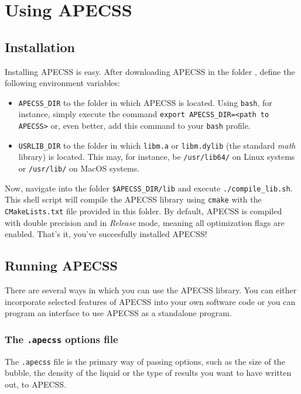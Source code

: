 \chapter{Using APECSS}

\section{Installation}
\label{sec:installation}

Installing APECSS is easy. After downloading APECSS in the folder {\tt <path to APECSS>}, define the following environment variables:\vspace{-1em}
\begin{itemize}[noitemsep]
\item {\tt APECSS\_DIR} to the folder in which APECSS is located. Using {\tt bash}, for instance, simply execute the command {\tt export APECSS\_DIR=<path to APECSS>} or, even better, add this command to your {\tt bash} profile.
\item {\tt USRLIB\_DIR} to the folder in which {\tt libm.a} or {\tt libm.dylib} (the standard \textit{math} library) is located. This may, for instance, be {\tt /usr/lib64/} on Linux systems or {\tt /usr/lib/} on MacOS systems.
\end{itemize}

Now, navigate into the folder {\tt \$APECSS\_DIR/lib} and execute {\tt ./compile\_lib.sh}. This shell script will compile the APECSS library using {\tt cmake} with the {\tt CMakeLists.txt} file provided in this folder. By default, APECSS is compiled with double precision and in \textit{Release} mode, meaning all optimization flags are enabled. That's it, you've succesfully installed APECSS!

\section{Running APECSS}

There are several ways in which you can use the APECSS library. You can either incorporate selected features of APECSS into your own software code or you can program an interface to use APECSS as a standalone program. 

\subsection{The {\tt *.apecss} options file}

The {\tt *.apecss} file is the primary way of passing options, such as the size of the bubble, the density of the liquid or the type of results you want to have written out, to APECSS. 

